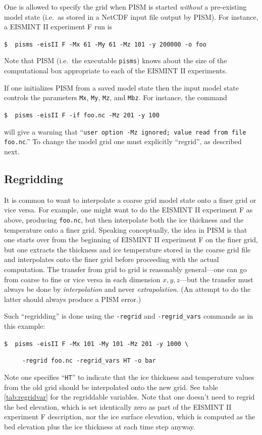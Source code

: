 \documentclass[11pt,final]{amsart}
\renewcommand{\t}[1]{\texttt{#1}}
\begin{document}
One is allowed to specify the grid when PISM is started \emph{without} a pre-existing model state (i.e.~as stored in a NetCDF input file output by PISM).  For instance, a EISMINT II experiment F \cite{EISMINT00} run is

\verb|$  pisms -eisII F -Mx 61 -My 61 -Mz 101 -y 200000 -o foo|

\noindent Note that PISM (i.e.~the executable \verb|pisms|) knows about the size of the computational box appropriate to each of the EISMINT II experiments.

If one initializes PISM from a saved model state then the input model state controls the parameters \t{Mx}, \t{My}, \t{Mz}, and \t{Mbz}.  For instance, the command

\verb|$  pisms -eisII F -if foo.nc -Mz 201 -y 100|

\noindent will give a warning that ``\verb|user option -Mz ignored; value read from file foo.nc|.''  To change the model grid one must explicitly ``regrid'', as described next.

\subsection{Regridding}  It is common to want to interpolate a coarse grid model state onto a finer grid or vice versa.  For example, one might want to do the EISMINT II experiment F as above, producing \verb|foo.nc|, but then interpolate both the ice thickness and the temperature onto a finer grid.  Speaking conceptually, the idea in PISM is that one starts over from the beginning of EISMINT II experiment F on the finer grid, but one extracts the thickness and ice temperature stored in the coarse grid file and interpolates onto the finer grid before proceeding with the actual computation.  The transfer from grid to grid is reasonably general---one can go from coarse to fine or vice versa in each dimension $x,y,z$---but the transfer must always be done by \emph{interpolation} and never \emph{extrapolation}.  (An attempt to do the latter should always produce a PISM error.)

Such ``regridding'' is done using the \verb|-regrid| and \verb|-regrid_vars| commands as in this example:

\verb|$  pisms -eisII F -Mx 101 -My 101 -Mz 201 -y 1000 \|

\verb|     -regrid foo.nc -regrid_vars HT -o bar|

\noindent Note one specifies ``\verb|HT|'' to indicate that the ice thickness and temperature values from the old grid should be interpolated onto the new grid.  See table \ref{tab:regridvar} for the regriddable variables.  Note that one doesn't need to regrid the bed elevation, which is set identically zero as part of the EISMINT II experiment F description, nor the ice surface elevation, which is computed as the bed elevation plus the ice thickness at each time step anyway.
\end{document}
